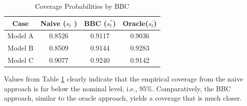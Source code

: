 \begin{table}[H]
	\addtolength{\tabcolsep}{25pt}
	\caption{Coverage Probabilities by  BBC} %
	\centering %
	\begin{tabular}{c c c c} %
		\hline\hline %
		Case & Naive ($s_t$ ) & BBC ($s_t^{''}$) & Oracle($s_t^\prime$) \\ %
		\hline %
		Model A& 0.8526 & 0.9117& 0.9036 \\ %
		Model B& 0.8509 & 0.9144 & 0.9283 \\
		Model C & 0.9077 & 0.9240 & 0.9142 \\ %
		\hline %
	\end{tabular}
	\label{table:coverage} %
\end{table}
Values from Table \ref{table:coverage} clearly indicate that the empirical coverage from the naive approach is far below the nominal level, i.e., 95\%. Comparatively, the BBC approach, similar to the oracle approach,  yields a coverage that is much closer.  


